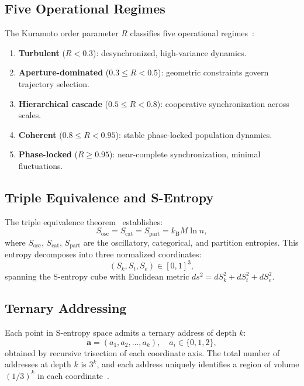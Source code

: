 \documentclass[aps,prd,twocolumn,superscriptaddress,floatfix,nofootinbib]{revtex4-2}
\theoremstyle{remark}
\newcommand{\kB}{k_{\mathrm{B}}}
\newcommand{\Sk}{S_k}
\newcommand{\St}{S_t}
\newcommand{\Se}{S_e}
\newcommand{\Sosc}{S_{\mathrm{osc}}}
\newcommand{\Scat}{S_{\mathrm{cat}}}
\newcommand{\Spart}{S_{\mathrm{part}}}
\begin{document}
\subsection{Five Operational Regimes}

The Kuramoto order parameter $R$ classifies five operational regimes~\cite{sachikonye2026regime}:
\begin{enumerate}[noitemsep]
    \item \textbf{Turbulent} ($R < 0.3$): desynchronized, high-variance dynamics.
    \item \textbf{Aperture-dominated} ($0.3 \leq R < 0.5$): geometric constraints govern trajectory selection.
    \item \textbf{Hierarchical cascade} ($0.5 \leq R < 0.8$): cooperative synchronization across scales.
    \item \textbf{Coherent} ($0.8 \leq R < 0.95$): stable phase-locked population dynamics.
    \item \textbf{Phase-locked} ($R \geq 0.95$): near-complete synchronization, minimal fluctuations.
\end{enumerate}

\subsection{Triple Equivalence and S-Entropy}

The triple equivalence theorem~\cite{sachikonye2026regime,sachikonye2026operator} establishes:
\begin{equation}
\boxed{\Sosc = \Scat = \Spart = \kB M \ln n,}
\label{eq:triple}
\end{equation}
where $\Sosc$, $\Scat$, $\Spart$ are the oscillatory, categorical, and partition entropies.
This entropy decomposes into three normalized coordinates:
\begin{equation}
(\Sk, \St, \Se) \in [0,1]^3,
\end{equation}
spanning the S-entropy cube with Euclidean metric $ds^2 = d\Sk^2 + d\St^2 + d\Se^2$.

\subsection{Ternary Addressing}

Each point in S-entropy space admits a ternary address of depth $k$:
\begin{equation}
\mathbf{a} = (a_1, a_2, \ldots, a_k), \quad a_i \in \{0, 1, 2\},
\end{equation}
obtained by recursive trisection of each coordinate axis.
The total number of addresses at depth $k$ is $3^k$, and each address uniquely identifies a region of volume $(1/3)^k$ in each coordinate~\cite{sachikonye2026operator}.
\end{document}
